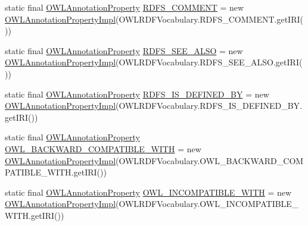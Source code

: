\begin{DoxyCompactItemize}
\item 
static final \hyperlink{interfaceorg_1_1semanticweb_1_1owlapi_1_1model_1_1_o_w_l_annotation_property}{O\-W\-L\-Annotation\-Property} \hyperlink{classuk_1_1ac_1_1manchester_1_1cs_1_1owl_1_1owlapi_1_1_o_w_l_data_factory_impl_a3ba79f9784e40eae72789776ff349b66}{R\-D\-F\-S\-\_\-\-C\-O\-M\-M\-E\-N\-T} = new \hyperlink{classuk_1_1ac_1_1manchester_1_1cs_1_1owl_1_1owlapi_1_1_o_w_l_annotation_property_impl}{O\-W\-L\-Annotation\-Property\-Impl}(O\-W\-L\-R\-D\-F\-Vocabulary.\-R\-D\-F\-S\-\_\-\-C\-O\-M\-M\-E\-N\-T.\-get\-I\-R\-I())
\item 
static final \hyperlink{interfaceorg_1_1semanticweb_1_1owlapi_1_1model_1_1_o_w_l_annotation_property}{O\-W\-L\-Annotation\-Property} \hyperlink{classuk_1_1ac_1_1manchester_1_1cs_1_1owl_1_1owlapi_1_1_o_w_l_data_factory_impl_a08548a7845a716de86cf67a51dad3a4e}{R\-D\-F\-S\-\_\-\-S\-E\-E\-\_\-\-A\-L\-S\-O} = new \hyperlink{classuk_1_1ac_1_1manchester_1_1cs_1_1owl_1_1owlapi_1_1_o_w_l_annotation_property_impl}{O\-W\-L\-Annotation\-Property\-Impl}(O\-W\-L\-R\-D\-F\-Vocabulary.\-R\-D\-F\-S\-\_\-\-S\-E\-E\-\_\-\-A\-L\-S\-O.\-get\-I\-R\-I())
\item 
static final \hyperlink{interfaceorg_1_1semanticweb_1_1owlapi_1_1model_1_1_o_w_l_annotation_property}{O\-W\-L\-Annotation\-Property} \hyperlink{classuk_1_1ac_1_1manchester_1_1cs_1_1owl_1_1owlapi_1_1_o_w_l_data_factory_impl_a4b09ef5de9be517ec60475304045ecd0}{R\-D\-F\-S\-\_\-\-I\-S\-\_\-\-D\-E\-F\-I\-N\-E\-D\-\_\-\-B\-Y} = new \hyperlink{classuk_1_1ac_1_1manchester_1_1cs_1_1owl_1_1owlapi_1_1_o_w_l_annotation_property_impl}{O\-W\-L\-Annotation\-Property\-Impl}(O\-W\-L\-R\-D\-F\-Vocabulary.\-R\-D\-F\-S\-\_\-\-I\-S\-\_\-\-D\-E\-F\-I\-N\-E\-D\-\_\-\-B\-Y.\-get\-I\-R\-I())
\item 
static final \hyperlink{interfaceorg_1_1semanticweb_1_1owlapi_1_1model_1_1_o_w_l_annotation_property}{O\-W\-L\-Annotation\-Property} \hyperlink{classuk_1_1ac_1_1manchester_1_1cs_1_1owl_1_1owlapi_1_1_o_w_l_data_factory_impl_a6f6142d22530ffab963caf068c6691b7}{O\-W\-L\-\_\-\-B\-A\-C\-K\-W\-A\-R\-D\-\_\-\-C\-O\-M\-P\-A\-T\-I\-B\-L\-E\-\_\-\-W\-I\-T\-H} = new \hyperlink{classuk_1_1ac_1_1manchester_1_1cs_1_1owl_1_1owlapi_1_1_o_w_l_annotation_property_impl}{O\-W\-L\-Annotation\-Property\-Impl}(O\-W\-L\-R\-D\-F\-Vocabulary.\-O\-W\-L\-\_\-\-B\-A\-C\-K\-W\-A\-R\-D\-\_\-\-C\-O\-M\-P\-A\-T\-I\-B\-L\-E\-\_\-\-W\-I\-T\-H.\-get\-I\-R\-I())
\item 
static final \hyperlink{interfaceorg_1_1semanticweb_1_1owlapi_1_1model_1_1_o_w_l_annotation_property}{O\-W\-L\-Annotation\-Property} \hyperlink{classuk_1_1ac_1_1manchester_1_1cs_1_1owl_1_1owlapi_1_1_o_w_l_data_factory_impl_a4568096661ab942c8301c276d7db23b6}{O\-W\-L\-\_\-\-I\-N\-C\-O\-M\-P\-A\-T\-I\-B\-L\-E\-\_\-\-W\-I\-T\-H} = new \hyperlink{classuk_1_1ac_1_1manchester_1_1cs_1_1owl_1_1owlapi_1_1_o_w_l_annotation_property_impl}{O\-W\-L\-Annotation\-Property\-Impl}(O\-W\-L\-R\-D\-F\-Vocabulary.\-O\-W\-L\-\_\-\-I\-N\-C\-O\-M\-P\-A\-T\-I\-B\-L\-E\-\_\-\-W\-I\-T\-H.\-get\-I\-R\-I())

\end{DoxyCompactItemize}
